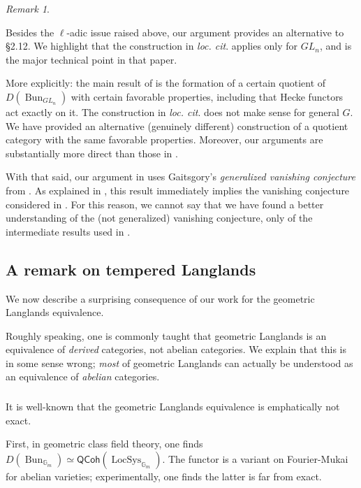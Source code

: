 \documentclass[reqno,11pt]{amsart}
\numberwithin{equation}{subsection}
\theoremstyle{remark}
\newtheorem{rem}[thm]{Remark}
\newcommand{\bG}{{\mathbb G}}
\newcommand{\on}{\operatorname}
\newcommand{\Bun}{\on{Bun}}
\newcommand{\LocSys}{\on{LocSys}}
\newcommand{\QCoh}{\mathsf{QCoh}}
\begin{document}
\begin{rem}\label{r:vanishing}

Besides the $\ell$-adic issue raised above, our argument
provides an alternative to \cite{vanishing} \S 2.12.
We highlight that the construction in \emph{loc. cit}. 
applies only for $GL_n$, and is the major technical point
in that paper. 

More explicitly: the main result of \cite{vanishing} is the
formation of a certain quotient
of $D(\Bun_{GL_n})$ with certain favorable properties, including
that Hecke functors act exactly on it. The construction in \emph{loc. cit}.
does not make sense for general $G$. We have provided an alternative
(genuinely different) construction of a quotient category with
the same favorable properties. Moreover, our arguments are
substantially more direct than those in \cite{vanishing}. 

With that said, our argument in \cite{independence} uses
Gaitsgory's \emph{generalized vanishing conjecture} from
\cite{generalized-vanishing}. As explained in \cite{generalized-vanishing},
this result immediately implies the vanishing conjecture 
considered in \cite{vanishing}. For this reason, 
we cannot say that we have found a better understanding of the
(not generalized) vanishing conjecture, only of the intermediate results
used in \cite{vanishing}.

\end{rem}

\subsection{A remark on tempered Langlands}\label{ss:intro-temp-gl}

We now describe a surprising consequence of our work
for the geometric Langlands equivalence.

Roughly speaking, one is commonly taught that
geometric Langlands is an equivalence of \emph{derived} categories,
not abelian categories. We explain that this is in some sense
wrong; \emph{most} of
geometric Langlands can actually be understood as an equivalence
of \emph{abelian} categories.

\subsubsection{}

It is well-known that the geometric Langlands equivalence 
is emphatically not exact. 

First, in geometric class field theory, 
one finds $D(\Bun_{\bG_m}) \simeq \QCoh(\LocSys_{\bG_m})$.
The functor is a variant on Fourier-Mukai for abelian varieties;
experimentally, one finds the latter is far from exact.
\end{document}
